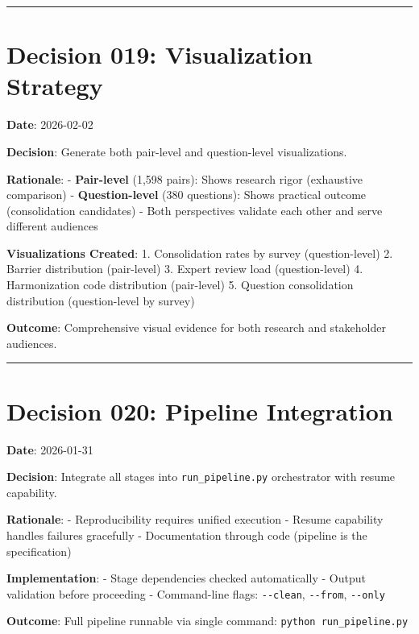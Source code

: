 \documentclass[
  letterpaper,
]{report}
\begin{document}
\begin{center}\rule{0.5\linewidth}{0.5pt}\end{center}

\section{Decision 019: Visualization
Strategy}\label{decision-019-visualization-strategy}

\textbf{Date}: 2026-02-02

\textbf{Decision}: Generate both pair-level and question-level
visualizations.

\textbf{Rationale}: - \textbf{Pair-level} (1,598 pairs): Shows research
rigor (exhaustive comparison) - \textbf{Question-level} (380 questions):
Shows practical outcome (consolidation candidates) - Both perspectives
validate each other and serve different audiences

\textbf{Visualizations Created}: 1. Consolidation rates by survey
(question-level) 2. Barrier distribution (pair-level) 3. Expert review
load (question-level) 4. Harmonization code distribution (pair-level) 5.
Question consolidation distribution (question-level by survey)

\textbf{Outcome}: Comprehensive visual evidence for both research and
stakeholder audiences.

\begin{center}\rule{0.5\linewidth}{0.5pt}\end{center}

\section{Decision 020: Pipeline
Integration}\label{decision-020-pipeline-integration}

\textbf{Date}: 2026-01-31

\textbf{Decision}: Integrate all stages into \texttt{run\_pipeline.py}
orchestrator with resume capability.

\textbf{Rationale}: - Reproducibility requires unified execution -
Resume capability handles failures gracefully - Documentation through
code (pipeline is the specification)

\textbf{Implementation}: - Stage dependencies checked automatically -
Output validation before proceeding - Command-line flags:
\texttt{-\/-clean}, \texttt{-\/-from}, \texttt{-\/-only}

\textbf{Outcome}: Full pipeline runnable via single command:
\texttt{python\ run\_pipeline.py}
\end{document}
